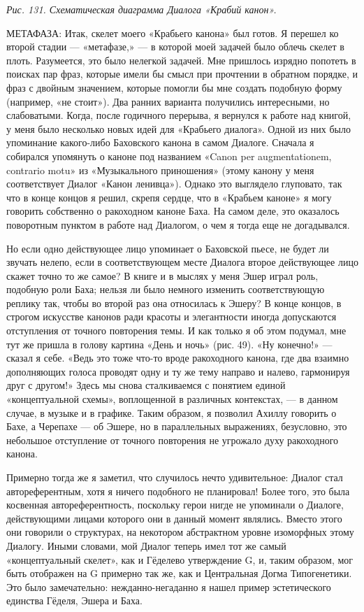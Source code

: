 \documentclass[../main.tex]{subfiles}
\begin{document}
\emph{Рис. 131. Схематическая диаграмма Диалога «Крабий канон».}

МЕТАФАЗА: Итак, скелет моего «Крабьего канона» был готов. Я перешел ко второй стадии --- «метафазе,» --- в которой моей задачей было облечь скелет в плоть. Разумеется, это было нелегкой задачей. Мне пришлось изрядно попотеть в поисках пар фраз, которые имели бы смысл при прочтении в обратном порядке, и фраз с двойным значением, которые помогли бы мне создать подобную форму (например, «не стоит»). Два ранних варианта получились интересными, но слабоватыми. Когда, после годичного перерыва, я вернулся к работе над книгой, у меня было несколько новых идей для «Крабьего диалога». Одной из них было упоминание какого-либо Баховского канона в самом Диалоге. Сначала я собирался упомянуть о каноне под названием «Canon per augmentationem, contrario motu» из «Музыкального приношения» (этому канону у меня соответствует Диалог «Канон ленивца»). Однако это выглядело глуповато, так что в конце концов я решил, скрепя сердце, что в «Крабьем каноне» я могу говорить собственно о ракоходном каноне Баха. На самом деле, это оказалось поворотным пунктом в работе над Диалогом, о чем я тогда еще не догадывался.

Но если одно действующее лицо упоминает о Баховской пьесе, не будет ли звучать нелепо, если в соответствующем месте Диалога второе действующее лицо скажет точно то же самое? В книге и в мыслях у меня Эшер играл роль, подобную роли Баха; нельзя ли было немного изменить соответствующую реплику так, чтобы во второй раз она относилась к Эшеру? В конце концов, в строгом искусстве канонов ради красоты и элегантности иногда допускаются отступления от точного повторения темы. И как только я об этом подумал, мне тут же пришла в голову картина «День и ночь» (рис. 49). «Ну конечно!» --- сказал я себе. «Ведь это тоже что-то вроде ракоходного канона, где два взаимно дополняющих голоса проводят одну и ту же тему направо и налево, гармонируя друг с другом!» Здесь мы снова сталкиваемся с понятием единой «концептуальной схемы», воплощенной в различных контекстах, --- в данном случае, в музыке и в графике. Таким образом, я позволил Ахиллу говорить о Бахе, а Черепахе --- об Эшере, но в параллельных выражениях, безусловно, это небольшое отступление от точного повторения не угрожало духу ракоходного канона.

Примерно тогда же я заметил, что случилось нечто удивительное: Диалог стал автореферентным, хотя я ничего подобного не планировал! Более того, это была косвенная автореферентность, поскольку герои нигде не упоминали о Диалоге, действующими лицами которого они в данный момент являлись. Вместо этого они говорили о структурах, на некотором абстрактном уровне изоморфных этому Диалогу. Иными словами, мой Диалог теперь имел тот же самый «концептуальный скелет», как и Гёделево утверждение G, и, таким образом, мог быть отображен на G примерно так же, как и Центральная Догма Типогенетики. Это было замечательно: нежданно-негаданно я нашел пример эстетического единства Гёделя, Эшера и Баха.
\end{document}

